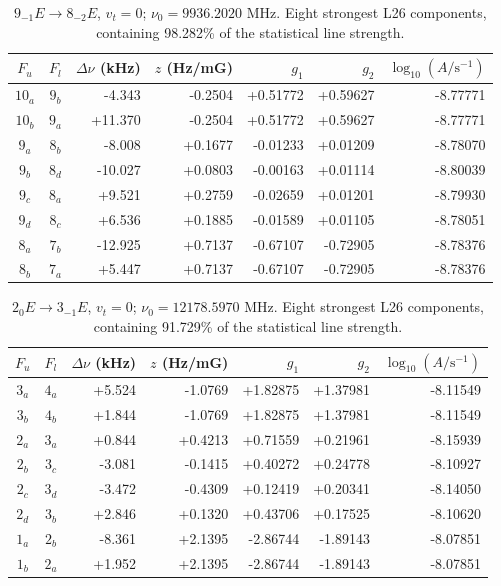 \begin{table}[!htbp]
\centering\small\renewcommand{\arraystretch}{1.1}\setlength{\tabcolsep}{5pt}
\caption{$9_{-1} E\rightarrow 8_{-2} E$, $v_t=0$; $\nu_0=9936.2020$ MHz. Eight strongest L26 components, containing 98.282\% of the statistical line strength.}
\label{tab:sm-zeeman-9p91}
\begin{tabular}{ccrrrrr}
\hline\hline
$F_u$ & $F_l$ & $\Delta\nu$ (kHz) & $z$ (Hz/mG) & $g_1$ & $g_2$ & $\log_{10}(A/\mathrm{s}^{-1})$ \\
\hline
$10_{a}$ & $9_{b}$ & -4.343 & -0.2504 & +0.51772 & +0.59627 & -8.77771\\
$10_{b}$ & $9_{a}$ & +11.370 & -0.2504 & +0.51772 & +0.59627 & -8.77771\\
$9_{a}$ & $8_{b}$ & -8.008 & +0.1677 & -0.01233 & +0.01209 & -8.78070\\
$9_{b}$ & $8_{d}$ & -10.027 & +0.0803 & -0.00163 & +0.01114 & -8.80039\\
$9_{c}$ & $8_{a}$ & +9.521 & +0.2759 & -0.02659 & +0.01201 & -8.79930\\
$9_{d}$ & $8_{c}$ & +6.536 & +0.1885 & -0.01589 & +0.01105 & -8.78051\\
$8_{a}$ & $7_{b}$ & -12.925 & +0.7137 & -0.67107 & -0.72905 & -8.78376\\
$8_{b}$ & $7_{a}$ & +5.447 & +0.7137 & -0.67107 & -0.72905 & -8.78376\\
\hline\end{tabular}
\end{table}

\begin{table}[!htbp]
\centering\small\renewcommand{\arraystretch}{1.1}\setlength{\tabcolsep}{5pt}
\caption{$2_{0} E\rightarrow 3_{-1} E$, $v_t=0$; $\nu_0=12178.5970$ MHz. Eight strongest L26 components, containing 91.729\% of the statistical line strength.}
\label{tab:sm-zeeman-12p2}
\begin{tabular}{ccrrrrr}
\hline\hline
$F_u$ & $F_l$ & $\Delta\nu$ (kHz) & $z$ (Hz/mG) & $g_1$ & $g_2$ & $\log_{10}(A/\mathrm{s}^{-1})$ \\
\hline
$3_{a}$ & $4_{a}$ & +5.524 & -1.0769 & +1.82875 & +1.37981 & -8.11549\\
$3_{b}$ & $4_{b}$ & +1.844 & -1.0769 & +1.82875 & +1.37981 & -8.11549\\
$2_{a}$ & $3_{a}$ & +0.844 & +0.4213 & +0.71559 & +0.21961 & -8.15939\\
$2_{b}$ & $3_{c}$ & -3.081 & -0.1415 & +0.40272 & +0.24778 & -8.10927\\
$2_{c}$ & $3_{d}$ & -3.472 & -0.4309 & +0.12419 & +0.20341 & -8.14050\\
$2_{d}$ & $3_{b}$ & +2.846 & +0.1320 & +0.43706 & +0.17525 & -8.10620\\
$1_{a}$ & $2_{b}$ & -8.361 & +2.1395 & -2.86744 & -1.89143 & -8.07851\\
$1_{b}$ & $2_{a}$ & +1.952 & +2.1395 & -2.86744 & -1.89143 & -8.07851\\
\hline\end{tabular}
\end{table}

